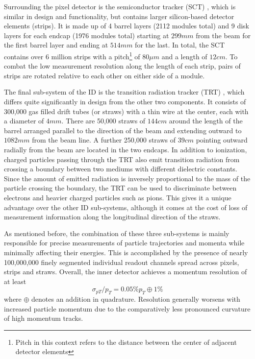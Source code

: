 Surrounding the pixel detector is the semiconductor tracker (SCT) \cite{atlas-sct}, which is similar in design and 
functionality, but contains larger silicon-based detector elements (strips). It is made up of 4 barrel layers (2112 
modules total) and 9 disk layers for each endcap (1976 modules total) starting at $299mm$ from the beam for the first 
barrel layer and ending at $514mm$ for the last. In total, the SCT contains over 6 million strips with a 
pitch\footnote{Pitch in this context refers to the distance between the center of adjacent detector elements} of 
$80\mu m$ and a length of $12cm$. To combat the low measurement resolution along the length of each strip, pairs of 
strips are rotated relative to each other on either side of a module. \par

The final sub-system of the ID is the transition radiation tracker (TRT) \cite{atlas-trt}, which differs quite 
significantly in design from the other two components. It consists of 300,000 gas filled drift tubes (or straws) with 
a thin wire at the center, each with a diameter of $4mm$. There are 50,000 straws of $144cm$ around the length of the 
barrel arranged parallel to the direction of the beam and extending outward to $1082mm$ from the beam line. A further 
250,000 straws of $39cm$ pointing outward radially from the beam are located in the two endcaps. In addition to 
ionization, charged particles passing through the TRT also emit transition radiation from crossing a boundary between 
two mediums with different dielectric constants. Since the amount of emitted radiation is inversely proportional to the 
mass of the particle crossing the boundary, the TRT can be used to discriminate between electrons and heavier charged 
particles such as pions. This gives it a unique advantage over the other ID sub-systems, although it comes at the cost 
of loss of measurement information along the longitudinal direction of the straws. \par

As mentioned before, the combination of these three sub-systems is mainly responsible for precise measurements of 
particle trajectories and momenta while minimally affecting their energies. This is accomplished by the presence of 
nearly 100,000,000 finely segmented individual readout channels spread across pixels, strips and straws. Overall, the 
inner detector achieves a momentum resolution of at least
\begin{equation}
\sigma_{pT}/p_T = 0.05\% p_T \oplus 1\%
\end{equation}
where $\oplus$ denotes an addition in quadrature. Resolution generally worsens with increased particle momentum due to 
the comparatively less pronounced curvature of high momentum tracks.

